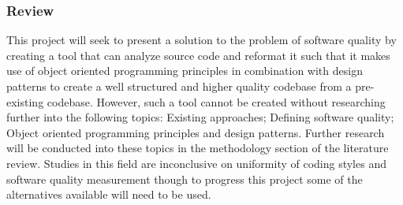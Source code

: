 \subsubsection{Review}
This project will seek to present a solution to the problem of software quality by creating a tool that can analyze source code and reformat it such that it makes use of object oriented programming principles in combination with design patterns to create a well structured and higher quality codebase from a pre-existing codebase.
However, such a tool cannot be created without researching further into the following topics: Existing approaches; Defining software quality; Object oriented programming principles and design patterns. Further research will be conducted into these topics in the methodology section of the literature review.
Studies in this field are inconclusive on uniformity of coding styles and software quality measurement though to progress this project some of the alternatives available will need to be used. 
